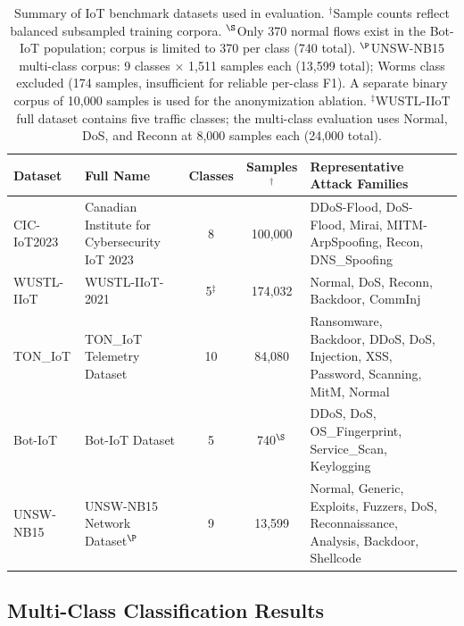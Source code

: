 \begin{table}[htbp]
\centering
\caption{Summary of IoT benchmark datasets used in evaluation.
  $^\dagger$Sample counts reflect balanced subsampled training corpora.
  $^\S$Only 370 normal flows exist in the Bot-IoT population; corpus is limited to 370 per class (740 total).
  $^\P$UNSW-NB15 multi-class corpus: 9 classes $\times$ 1{,}511 samples each (13{,}599 total);
  Worms class excluded (174 samples, insufficient for reliable per-class F1).
  A separate binary corpus of 10{,}000 samples is used for the anonymization ablation.
  $^\ddagger$WUSTL-IIoT full dataset contains five traffic classes; the multi-class evaluation uses Normal, DoS, and Reconn at 8{,}000 samples each (24{,}000 total).}
\label{tab:datasets}
\begin{tabularx}{\textwidth}{llccXl}
\toprule
\textbf{Dataset} & \textbf{Full Name} & \textbf{Classes} & \textbf{Samples}$^\dagger$ & \textbf{Representative Attack Families} \\
\midrule
CIC-IoT2023   & Canadian Institute for Cybersecurity IoT 2023 & 8  & 100{,}000 & DDoS-Flood, DoS-Flood, Mirai, MITM-ArpSpoofing, Recon, DNS\_Spoofing \\
WUSTL-IIoT    & WUSTL-IIoT-2021                               & 5$^\ddagger$  & 174{,}032 & Normal, DoS, Reconn, Backdoor, CommInj \\
TON\_IoT      & TON\_IoT Telemetry Dataset                    & 10 & 84{,}080   & Ransomware, Backdoor, DDoS, DoS, Injection, XSS, Password, Scanning, MitM, Normal \\
Bot-IoT       & Bot-IoT Dataset                               & 5  & 740$^\S$   & DDoS, DoS, OS\_Fingerprint, Service\_Scan, Keylogging \\
UNSW-NB15     & UNSW-NB15 Network Dataset$^\P$                & 9  & 13{,}599  & Normal, Generic, Exploits, Fuzzers, DoS, Reconnaissance, Analysis, Backdoor, Shellcode \\
\bottomrule
\end{tabularx}
\end{table}

\subsection{Multi-Class Classification Results}\label{subsec:multiclass_results}

